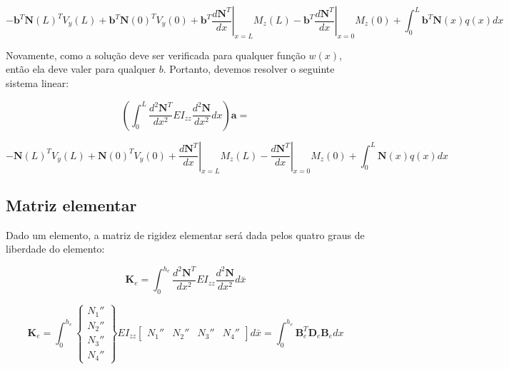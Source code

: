         \begin{equation}
            -\mathbf{b}^T \mathbf{N}(L)^T V_y(L) + \mathbf{b}^T \mathbf{N}(0)^T V_y(0) + \mathbf{b}^T \left.\frac{d\mathbf{N}^T}{dx}\right|_{x=L}M_z(L) - \mathbf{b}^T \left.\frac{d\mathbf{N}^T}{dx}\right|_{x=0}M_z(0)+ \int_0^L \mathbf{b}^T \mathbf{N}(x) q(x) dx
        \end{equation}

        Novamente, como a solução deve ser verificada para qualquer função $w(x)$, então ela deve valer para qualquer $b$. Portanto, devemos resolver o seguinte sistema linear:

        \begin{equation*}
            \left(\int_0^L \frac{d^2\mathbf{N}^T}{dx^2} EI_{zz}\frac{d^2\mathbf{N}}{dx^2} dx \right)\mathbf{a} = 
        \end{equation*}

        \begin{equation}
            -\mathbf{N}(L)^T V_y(L) + \mathbf{N}(0)^T V_y(0) + \left.\frac{d\mathbf{N}^T}{dx}\right|_{x=L}M_z(L) - \left.\frac{d\mathbf{N}^T}{dx}\right|_{x=0}M_z(0)+ \int_0^L \mathbf{N}(x) q(x) dx
        \end{equation}
        
    \subsection{Matriz elementar}

        Dado um elemento, a matriz de rigidez elementar será dada pelos quatro graus de liberdade do elemento:

        \begin{equation*}
            \mathbf{K}_e = \int_0^{h_e} \frac{d^2\mathbf{N}^T}{dx^2} EI_{zz}\frac{d^2\mathbf{N}}{dx^2} d\bar{x}
        \end{equation*}

        \begin{equation}
            \mathbf{K}_e = \int_0^{h_e} 
            \begin{Bmatrix}
                N_1'' \\
                N_2'' \\
                N_3'' \\
                N_4''
            \end{Bmatrix} 
             EI_{zz} 
             \begin{bmatrix}
                N_1'' &
                N_2'' &
                N_3'' &
                N_4''
            \end{bmatrix}  d\bar{x} =
            \int_0^{h_e}
            \mathbf{B}_e^T
            \mathbf{D}_e
            \mathbf{B}_e
            dx
        \end{equation}


